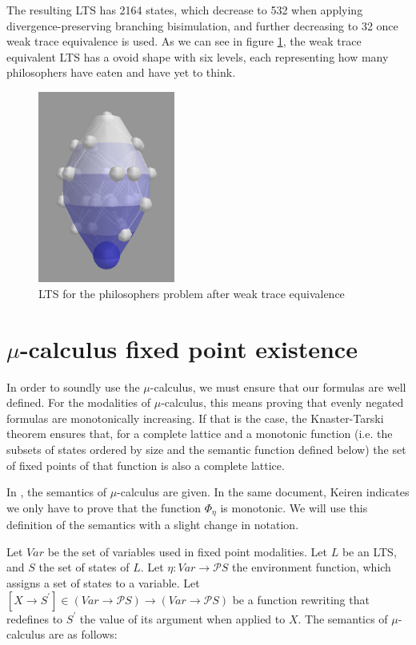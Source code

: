 \documentclass[11pt]{article}
\theoremstyle{definition}
\theoremstyle{plain}
\begin{document}
\begin{appendices}
The resulting LTS has 2164 states, which decrease to 532 when applying divergence-preserving branching bisimulation, and further decreasing to 32 once weak trace equivalence is used. As we can see in figure \ref{phiwt}, the weak trace equivalent LTS has a ovoid shape with six levels, each representing how many philosophers have eaten and have yet to think.

\begin{figure}[hb!]
\centering
\includegraphics[width=0.4\textwidth, keepaspectratio]{img/Philosophers/wt.png}
\caption{LTS for the philosophers problem after weak trace equivalence}\label{phiwt}
\end{figure}
\clearpage
\section{\texorpdfstring{$ \mu $}{}-calculus fixed point existence}
\label{appendix:monotony}
In order to soundly use the $ \mu $-calculus, we must ensure that our formulas are well defined. For the modalities of $ \mu $-calculus, this means proving that evenly negated formulas are monotonically increasing. If that is the case, the Knaster-Tarski theorem ensures that, for a complete lattice and a monotonic function (i.e. the subsets of states ordered by size and the semantic function defined below) the set of fixed points of that function is also a complete lattice.

In \cite{keiren2013modal}, the semantics of $ \mu $-calculus are given. In the same document, Keiren indicates we only have to prove that the function $ \Phi_\eta $ is monotonic. We will use this definition of the semantics with a slight change in notation.

Let $ Var $ be the set of variables used in fixed point modalities. Let $ L $ be an LTS, and $ S $ the set of states of $ L $. Let $ \eta: Var \rightarrow \mathcal{P}S $ the environment function, which assigns a set of states to a variable. Let $ [X\rightarrow S^\prime] \in (Var\rightarrow\mathcal{P}S)\rightarrow(Var\rightarrow\mathcal{P}S) $ be a function rewriting that redefines to $ S^\prime $ the value of its argument when applied to $ X $. The semantics of $ \mu$-calculus are as follows:


\end{appendices}
\end{document}
